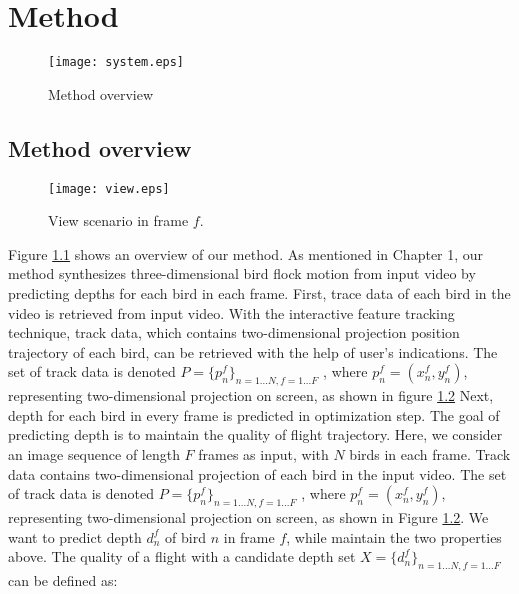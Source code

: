 \chapter{Method}


\begin{figure}[h]
 \begin{center}
  \texttt{[image: system.eps]}
 \end{center}
 \caption{Method overview}
 \label{figure:system}
\end{figure}


\section{Method overview}


\begin{figure}[h]
 \begin{center}
  \texttt{[image: view.eps]}
 \end{center}
 \caption{View scenario in frame $f$.}
 \label{figure:view}
\end{figure}


Figure \ref{figure:system}  shows an overview of our method. As mentioned in Chapter 1, our method synthesizes three-dimensional bird flock motion from input video by predicting depths for each bird in each frame. First, trace data of each bird in the video is retrieved from input video. With the interactive feature tracking technique, track data, which contains two-dimensional projection position trajectory of each bird, can be retrieved with the help of user's indications. The set of track data is denoted $P=\big\{p_n^f\big\}_{n=1...N,f=1...F}$ , where $p_n^f=(x_n^f, y_n^f)$, representing two-dimensional projection on screen, as shown in figure \ref{figure:view} Next, depth for each bird in every frame is predicted in optimization step. The goal of predicting depth is to maintain the quality of flight trajectory. Here, we consider an image sequence of length $F$ frames as input, with $N$ birds in each frame. Track data contains two-dimensional projection of each bird in the input video. The set of track data is denoted $P=\big\{p_n^f\big\}_{n=1...N,f=1...F}$ , where $p_n^f=(x_n^f, y_n^f)$, representing two-dimensional projection on screen, as shown in Figure \ref{figure:view}. We want to predict depth $d_n^f$ of bird $n$ in frame $f$, while maintain the two properties above. The quality of a flight with a candidate depth set $X=\big\{d_n^f\big\}_{n=1...N,f=1...F}$ can be defined as:


